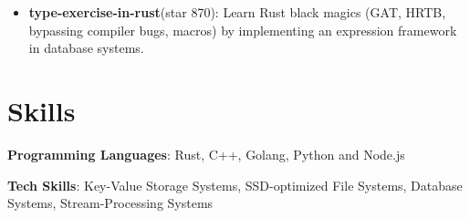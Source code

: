 \documentclass{chicv}
\begin{document}
\begin{itemize}
  \item \textbf{type-exercise-in-rust}(star 870): Learn Rust black magics (GAT, HRTB, bypassing compiler bugs, macros) by implementing an expression framework in database systems. %
\end{itemize}


\section{Skills}

\begin{skilllist}
  \item \textbf{Programming Languages}: Rust, C++, Golang, Python and Node.js
  \item \textbf{Tech Skills}: Key-Value Storage Systems, SSD-optimized File Systems, Database Systems, Stream-Processing Systems
\end{skilllist}
\end{document}
